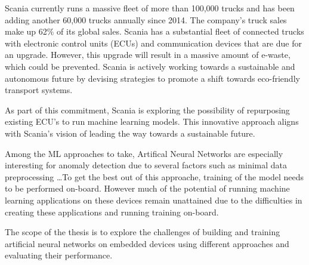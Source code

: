 Scania currently runs a massive fleet of more than 100,000 trucks and has been adding another 60,000 trucks annually since 2014. The company's truck sales make up 62\% of its global sales. Scania has a substantial fleet of connected trucks with electronic control units (ECUs) and communication devices that are due for an upgrade. However, this upgrade will result in a massive amount of e-waste, which could be prevented. Scania is actively working towards a sustainable and autonomous future by devising strategies to promote a shift towards eco-friendly transport systems.

As part of this commitment, Scania is exploring the possibility of repurposing existing ECU's to run machine learning models. This innovative approach aligns with Scania's vision of leading the way towards a sustainable future.





Among the ML approaches to take, Artifical Neural Networks are especially interesting for anomaly detection due to several factors such as minimal data preprocessing \dots To get the best out of this approache, training of the model needs to be performed on-board. However much of the potential of running machine learning applications on these devices remain unattained due to the difficulties in creating these applications and running training on-board.

The scope of the thesis is to explore the challenges of building and training artificial neural networks on embedded devices using different approaches and evaluating their performance.


